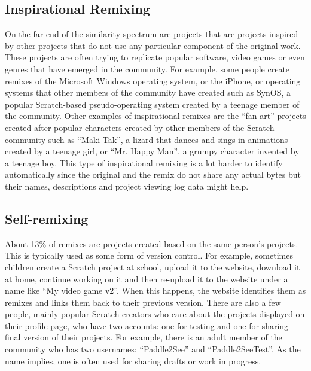 \subsection{Inspirational Remixing}
On the far end of the similarity spectrum are projects that are projects inspired by other projects that do not use any particular component of the original work.
These projects are often trying to replicate popular software, video games or even genres that have emerged in the community.
For example, some people create remixes of the Microsoft Windows operating system, or the iPhone, or operating systems that other members of the community have created such as SynOS, a popular Scratch-based pseudo-operating system created by a teenage member of the community.
Other examples of inspirational remixes are the ``fan art'' projects created after popular characters created by other members of the Scratch community such as ``Maki-Tak'', a lizard that dances and sings in animations created by a teenage girl,  or  ``Mr. Happy Man'', a grumpy character invented by a teenage boy.
This type of inspirational remixing is a lot harder to identify automatically since the original and the remix do not share any actual bytes but their names, descriptions and project viewing log data might help. 

\subsection{Self-remixing}
About 13\% of remixes are projects created based on the same person's projects.
This is typically used as some form of version control.
For example, sometimes children create a Scratch project at school, upload it to the website, download it at home, continue working on it and then re-upload it to the website under a name like ``My video game v2''.
When this happens, the website identifies them as remixes and links them back to their previous version.
There are also a few people, mainly popular Scratch creators who care about the projects displayed on their profile page, who have two accounts: one for testing and one for sharing final version of their projects.
For example, there is an adult member of the community who has two usernames: ``Paddle2See'' and ``Paddle2SeeTest''.
As the name implies, one is often used for sharing drafts or work in progress.
 
